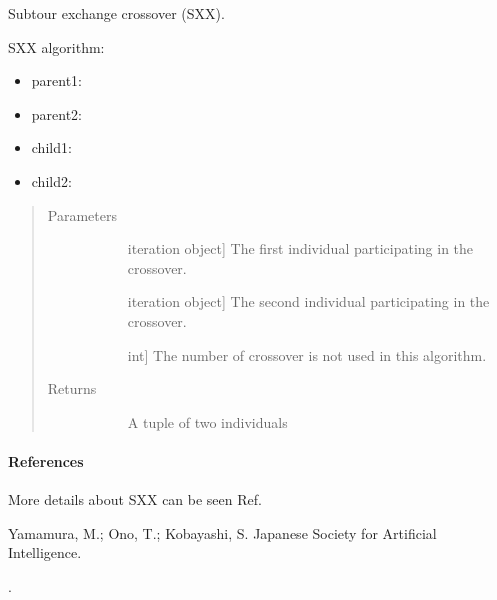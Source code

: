 \documentclass[letterpaper,10pt,english]{sphinxmanual}
\begin{document}

\begin{fulllineitems}
\label{\detokenize{pygace:pygace.ga.subtour_exchange_crossover}}
Subtour exchange crossover (SXX).

SXX algorithm:
\begin{itemize}
\item {} 
parent1: 

\item {} 
parent2: 

\item {} 
child1: 

\item {} 
child2: 

\end{itemize}
\begin{quote}\begin{description}
\item[{Parameters}] \leavevmode\begin{description}
\item[{}] \leavevmode{[}iteration object{]}
The first individual participating in the crossover.

\item[{}] \leavevmode{[}iteration object{]}
The second individual participating in the crossover.

\item[{}] \leavevmode{[}int{]}
The number of crossover is not used in this algorithm.

\end{description}

\item[{Returns}] \leavevmode\begin{description}
\item[{}] \leavevmode
A tuple of two individuals

\end{description}

\end{description}\end{quote}
\paragraph{References}

More details about SXX can be seen Ref. %
\begin{footnote}[6]\sphinxAtStartFootnote
Yamamura, M.; Ono, T.; Kobayashi, S. Japanese Society for Artificial
Intelligence.
%
\end{footnote}.

\end{fulllineitems}
\end{document}

